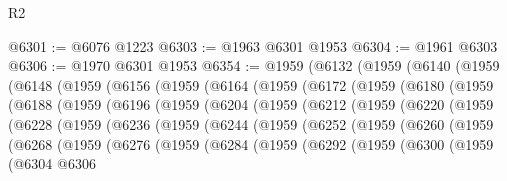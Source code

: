 \begin{lexlean}{R2}
\begin{coremodule}
@6301 := @6076 @1223
@6303 := @1963 @6301 @1953
@6304 := @1961 @6303
@6306 := @1970 @6301 @1953
@6354 := @1959
    (@6132
      (@1959
        (@6140
          (@1959
            (@6148
              (@1959
                (@6156
                  (@1959
                    (@6164
                      (@1959
                        (@6172
                          (@1959
                            (@6180
                              (@1959
                                (@6188
                                  (@1959
                                    (@6196
                                      (@1959
                                        (@6204
                                          (@1959
                                            (@6212
                                              (@1959
                                                (@6220
                                                  (@1959
                                                    (@6228
                                                      (@1959
                                                        (@6236
                                                          (@1959
                                                            (@6244
                                                              (@1959
                                                                (@6252
                                                                  (@1959
                                                                    (@6260
                                                                      (@1959
                                                                        (@6268
                                                                          (@1959
                                                                            (@6276
                                                                              (@1959
                                                                                (@6284
                                                                                  (@1959
                                                                                    (@6292
                                                                                      (@1959
                                                                                        (@6300
                                                                                          (@1959
                                                                                            (@6304
                                                                                              @6306

\end{coremodule}
\end{lexlean}
